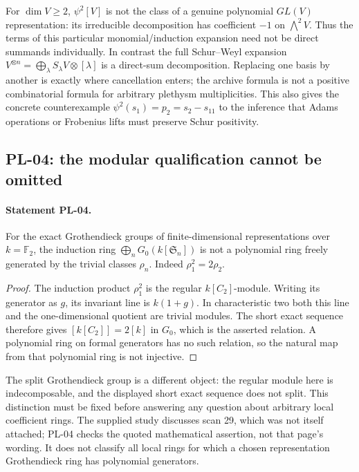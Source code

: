 \documentclass[11pt,a4paper]{article}
\begin{document}
For $\dim V\geq2$, $\psi^2[V]$ is not the class of a genuine polynomial
$GL(V)$ representation: its irreducible decomposition has coefficient $-1$
on $\bigwedge^2V$. Thus the terms of this particular monomial/induction
expansion need not be direct summands individually. In contrast the full
Schur--Weyl expansion
$V^{\otimes n}=\bigoplus_\lambda S_\lambda V\otimes[\lambda]$
is a direct-sum decomposition. Replacing one basis by another is exactly
where cancellation enters; the archive formula is not a positive combinatorial
formula for arbitrary plethysm multiplicities. This also gives the concrete
counterexample $\psi^2(s_1)=p_2=s_2-s_{11}$ to the inference that Adams
operations or Frobenius lifts must preserve Schur positivity.

\subsection{PL-04: the modular qualification cannot be omitted}
\paragraph{Statement PL-04.}
For the exact Grothendieck groups of finite-dimensional representations over
$k=\mathbb F_2$, the induction ring
$\bigoplus_nG_0(k[\mathfrak S_n])$ is not a polynomial ring freely generated
by the trivial classes $\rho_n$. Indeed $\rho_1^2=2\rho_2$.

\begin{proof}
The induction product $\rho_1^2$ is the regular $k[C_2]$-module.
Writing its generator as $g$, its invariant line is $k(1+g)$. In
characteristic two both this line and the one-dimensional quotient are
trivial modules. The short exact sequence therefore gives
$[k[C_2]]=2[k]$ in $G_0$, which is the asserted relation. A polynomial ring
on formal generators has no such relation, so the natural map from that
polynomial ring is not injective.
\end{proof}

The split Grothendieck group is a different object: the regular module here
is indecomposable, and the displayed short exact sequence does not split.
This distinction must be fixed before answering any question about arbitrary
local coefficient rings. The supplied study discusses scan 29, which was not
itself attached; PL-04 checks the quoted mathematical assertion, not that
page's wording. It does not classify all local rings for which a chosen
representation Grothendieck ring has polynomial generators.
\end{document}
